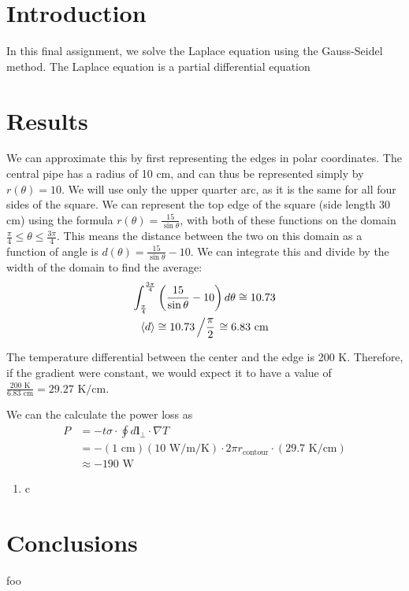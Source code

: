 \documentclass{article}
\author{\hwauthor}
\title{\hwtitle}
\date{\hwdate}
\begin{document}
\maketitle
\thispagestyle{fancy}

\section{Introduction}

In this final assignment, we solve the Laplace equation using the Gauss-Seidel method. The Laplace equation is a partial differential equation

\section{Results}

\bigskip
{}
\medskip

We can approximate this by first representing the edges in polar coordinates. The central pipe has a radius of 10 cm, and can thus be represented simply by $r(\theta) = 10$. We will use only the upper quarter arc, as it is the same for all four sides of the square. We can represent the top edge of the square (side length 30 cm) using the formula $r(\theta)=\frac{15}{\sin\theta}$, with both of these functions on the domain $\frac{\pi}{4}\leq \theta \leq \frac{3\pi}{4}$. This means the distance between the two on this domain as a function of angle is $d(\theta)=\frac{15}{\sin\theta}-10$. We can integrate this and divide by the width of the domain to find the average: \begin{gather*}
    \int_{\pi\over 4}^{3\pi\over 4} \left(\frac{15}{\sin\theta}-10\right)d\theta \cong 10.73 \\
    \langle d \rangle \cong 10.73\left/\frac{\pi}{2}\right. \cong 6.83\text{ cm}
\end{gather*}

The temperature differential between the center and the edge is 200 K. Therefore, if the gradient were constant, we would expect it to have a value of $\displaystyle \frac{200\text{ K}}{6.83\text{ cm}}=29.27\text{ K/cm}$.

We can the calculate the power loss as \begin{align*}
    P &= -t\sigma \cdot \oint d\mathbf{l}_\perp \cdot \nabla T \\
    &= -(1\text{ cm})(10\text{ W/m/K}) \cdot 2\pi r_\text{contour} \cdot (29.7\text{ K/cm}) \\
    &\approx \boxed{-190\text{ W}}
\end{align*}

\bigskip
{}
\medskip

\begin{enumerate}[label=\alph*)]
    \item c
\end{enumerate}

\bigskip
{}
\medskip



\bigskip
{}
\medskip



\section{Conclusions}

foo
\end{document}

